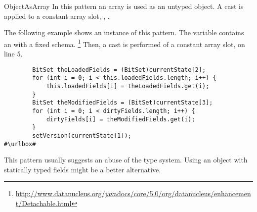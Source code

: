 \begin{pattern}{ObjectAsArray}
In this pattern an array is used as an untyped object.
A cast is applied to a constant array slot, \eg, .

\instances{}
The following example shows an instance of this pattern.
The variable  contains an  with a fixed schema.%
\footnote{\url{http://www.datanucleus.org/javadocs/core/5.0/org/datanucleus/enhancement/Detachable.html}}
Then, a cast is performed of a constant array slot,
 on line 5.

\def\urlvar{http://bit.ly/datanucleus_datanucleus_core_2S1L5Zf}
\begin{verbatim}
        BitSet theLoadedFields = (BitSet)currentState[2];
        for (int i = 0; i < this.loadedFields.length; i++) {
            this.loadedFields[i] = theLoadedFields.get(i);
        }
        BitSet theModifiedFields = (BitSet)currentState[3];
        for (int i = 0; i < dirtyFields.length; i++) {
            dirtyFields[i] = theModifiedFields.get(i);
        }
        setVersion(currentState[1]);
#\urlbox#
\end{verbatim}

\issues{}
This pattern usually suggests an abuse of the type system.
Using an object with statically typed fields might be a better alternative.

\end{pattern}
